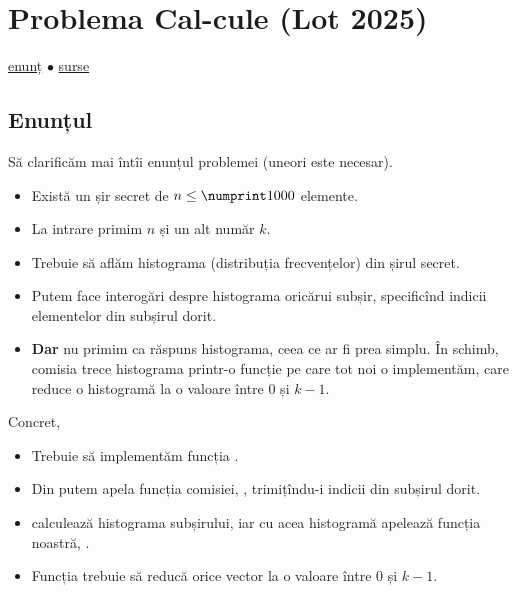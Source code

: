\documentclass[../main.tex]{subfiles}
\begin{document}
\section{Problema Cal-cule (Lot 2025)}
\label{problem:cal-cule}

\href{https://kilonova.ro/problems/3820}{enunț}
$\bullet$
\hyperref[code:cal-cule]{surse}

\subsection{Enunțul}

Să clarificăm mai întîi enunțul problemei (uneori este necesar).

\begin{itemize}
  \item Există un șir secret de $n \leq \np{1000}$ elemente.

  \item La intrare primim $n$ și un alt număr $k$.

  \item Trebuie să aflăm histograma (distribuția frecvențelor) din șirul secret.

  \item Putem face interogări despre histograma oricărui subșir, specificînd indicii elementelor din subșirul dorit.

  \item \textbf{Dar} nu primim ca răspuns histograma, ceea ce ar fi prea simplu. În schimb, comisia trece histograma printr-o funcție pe care tot noi o implementăm, care reduce o histogramă la o valoare între $0$ și $k-1$.
\end{itemize}

Concret,

\begin{itemize}
  \item Trebuie să implementăm funcția .

  \item Din  putem apela funcția comisiei, , trimițîndu-i indicii din subșirul dorit.

  \item {} calculează histograma subșirului, iar cu acea histogramă apelează funcția noastră, .

  \item Funcția  trebuie să reducă orice vector la o valoare între $0$ și $k-1$.
\end{itemize}
\end{document}
